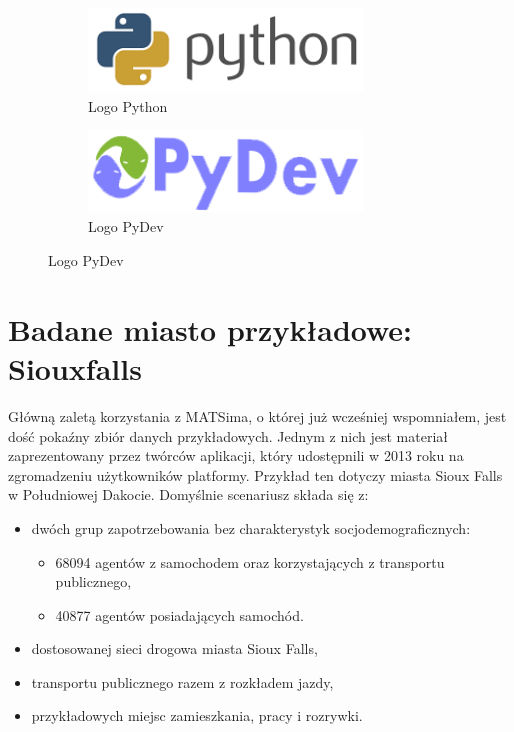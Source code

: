 \documentclass[twoside,12pt]{report}
\begin{document}
\begin{figure}[h]
\begin{flushleft}
	\begin{subfigure}[]{.47\textwidth}
	\vspace*{30px}
	\centering
	\includegraphics[width=0.8\textwidth]{img/py}
	\caption{Logo Python\cite{python}}
	\end{subfigure}%
\end{flushleft}
\begin{flushright}
	\begin{subfigure}[]{.47\textwidth}
	\centering
	\includegraphics[width=0.8\textwidth]{img/pydev}
	\caption{Logo PyDev\cite{pydev}}
	\end{subfigure}
\end{flushright}
\end{figure}

\section{Badane miasto przykładowe: Siouxfalls}

Główną zaletą korzystania z MATSima, o której już wcześniej wspomniałem, jest dość pokaźny zbiór danych przykładowych. Jednym z nich jest materiał zaprezentowany przez twórców aplikacji, który udostępnili w 2013 roku na zgromadzeniu użytkowników platformy\cite{siux}. Przykład ten dotyczy miasta Sioux Falls w Południowej Dakocie. Domyślnie scenariusz składa się z:

\begin{itemize}
\item dwóch grup zapotrzebowania bez charakterystyk socjodemograficznych:
\begin{itemize}
\item 68094 agentów z samochodem oraz korzystających z transportu publicznego,
\item 40877 agentów posiadających samochód.
\end{itemize}
\item dostosowanej sieci drogowa miasta Sioux Falls,
\item transportu publicznego razem z rozkładem jazdy,
\item przykładowych miejsc zamieszkania, pracy i rozrywki.
\end{itemize}
\end{document}
